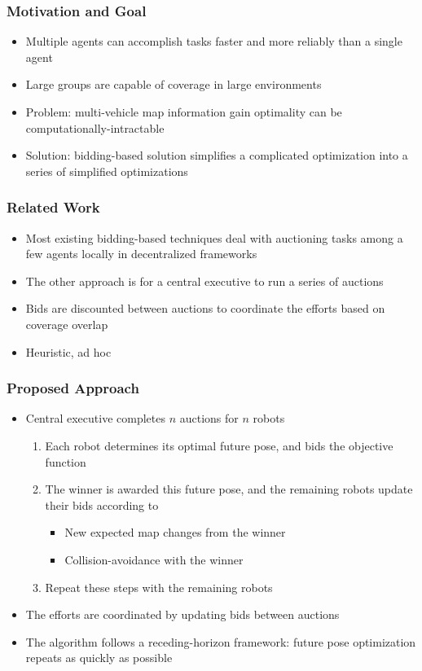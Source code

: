 \documentclass[11pt,professionalfonts,hyperref={pdftex,pdfpagemode=none,pdfstartview=FitH}]{beamer}
\begin{document}
\begin{frame}
\frametitle{Motivation and Goal}

\begin{itemize}
	\item Multiple agents can accomplish tasks faster and more reliably than a single agent
	\item Large groups are capable of coverage in large environments
	\item Problem: multi-vehicle map information gain optimality can be computationally-intractable
	\item Solution: bidding-based solution simplifies a complicated optimization into a series of simplified optimizations
\end{itemize}

\end{frame}

\begin{frame}
\frametitle{Related Work}

\begin{itemize}
	\item Most existing bidding-based techniques deal with auctioning tasks among a few agents locally in decentralized frameworks
	\item The other approach is for a central executive to run a series of auctions
	\item Bids are discounted between auctions to coordinate the efforts based on coverage overlap
	\item Heuristic, ad hoc
\end{itemize}

\end{frame}

\begin{frame}
\frametitle{Proposed Approach}

\begin{itemize}
\item Central executive completes $n$ auctions for $n$ robots
\begin{enumerate}
	\item Each robot determines its optimal future pose, and bids the objective function
	\item The winner is awarded this future pose, and the remaining robots update their bids according to
	\begin{itemize}
		\item New expected map changes from the winner
		\item Collision-avoidance with the winner
	\end{itemize}
	\item Repeat these steps with the remaining robots
\end{enumerate}
\item The efforts are coordinated by updating bids between auctions
\item The algorithm follows a receding-horizon framework: future pose optimization repeats as quickly as possible
\end{itemize}
\end{frame}
\end{document}
